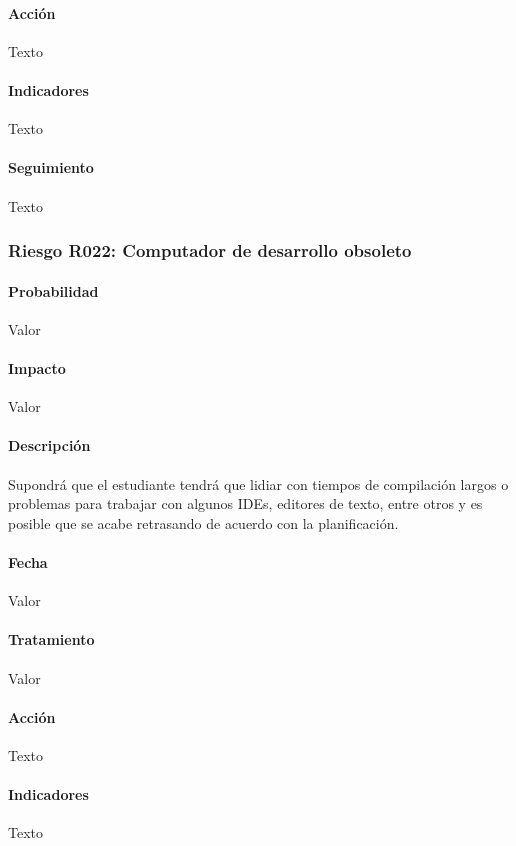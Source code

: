 \documentclass[10pt,a4paper]{article}
\begin{document}
				\paragraph{Acción} Texto %
				\paragraph{Indicadores} Texto %
				\paragraph{Seguimiento}	Texto %
				\subsubsection{Riesgo R022: Computador de desarrollo obsoleto}
				\paragraph{Probabilidad} Valor
				\paragraph{Impacto}	Valor
				\paragraph{Descripción} Supondrá que el estudiante tendrá que lidiar con tiempos de compilación largos o problemas para trabajar con algunos IDEs, editores de texto, entre otros y es posible que se acabe retrasando de acuerdo con la planificación.
				\paragraph{Fecha} Valor %
				\paragraph{Tratamiento} Valor %
				\paragraph{Acción} Texto %
				\paragraph{Indicadores} Texto %
\end{document}

